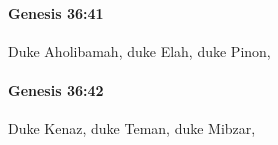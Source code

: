 		\paragraph{Genesis 36:41} %
			\label{GENESIS-36-41}

			Duke Aholibamah, duke Elah, duke Pinon,


		\paragraph{Genesis 36:42} %
			\label{GENESIS-36-42}

			Duke Kenaz, duke Teman, duke Mibzar,


